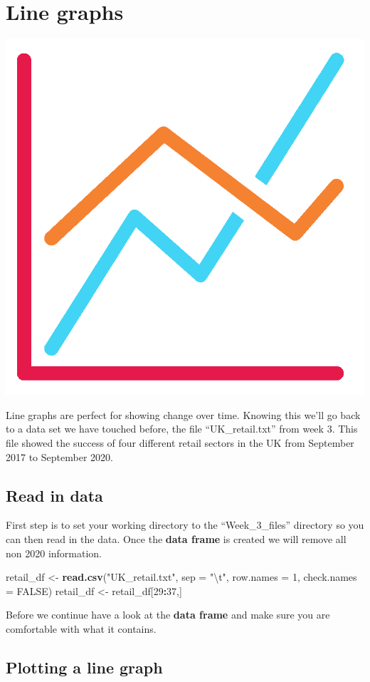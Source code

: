 \documentclass[]{book}
\newenvironment{Shaded}{\begin{snugshade}}{\end{snugshade}}
\newcommand{\KeywordTok}[1]{\textcolor[rgb]{0.13,0.29,0.53}{\textbf{#1}}}
\newcommand{\DataTypeTok}[1]{\textcolor[rgb]{0.13,0.29,0.53}{#1}}
\newcommand{\DecValTok}[1]{\textcolor[rgb]{0.00,0.00,0.81}{#1}}
\newcommand{\CharTok}[1]{\textcolor[rgb]{0.31,0.60,0.02}{#1}}
\newcommand{\StringTok}[1]{\textcolor[rgb]{0.31,0.60,0.02}{#1}}
\newcommand{\OtherTok}[1]{\textcolor[rgb]{0.56,0.35,0.01}{#1}}
\newcommand{\OperatorTok}[1]{\textcolor[rgb]{0.81,0.36,0.00}{\textbf{#1}}}
\newcommand{\NormalTok}[1]{#1}
\begin{document}
\section{Line graphs}\label{line-graphs}

\begin{center}\includegraphics[width=0.2\linewidth]{figures/line_graph} \end{center}

Line graphs are perfect for showing change over time. Knowing this we'll
go back to a data set we have touched before, the file
``UK\_retail.txt'' from week 3. This file showed the success of four
different retail sectors in the UK from September 2017 to September
2020.

\subsection{Read in data}\label{read-in-data}

First step is to set your working directory to the ``Week\_3\_files''
directory so you can then read in the data. Once the \textbf{data frame}
is created we will remove all non 2020 information.

\begin{Shaded}
\begin{Highlighting}[]
\NormalTok{retail_df <-}\StringTok{ }\KeywordTok{read.csv}\NormalTok{(}\StringTok{"UK_retail.txt"}\NormalTok{, }\DataTypeTok{sep =} \StringTok{"}\CharTok{\textbackslash{}t}\StringTok{"}\NormalTok{, }\DataTypeTok{row.names =} \DecValTok{1}\NormalTok{, }\DataTypeTok{check.names =} \OtherTok{FALSE}\NormalTok{)}
\NormalTok{retail_df <-}\StringTok{ }\NormalTok{retail_df[}\DecValTok{29}\OperatorTok{:}\DecValTok{37}\NormalTok{,]}
\end{Highlighting}
\end{Shaded}

Before we continue have a look at the \textbf{data frame} and make sure
you are comfortable with what it contains.

\subsection{Plotting a line graph}\label{plotting-a-line-graph}
\end{document}
